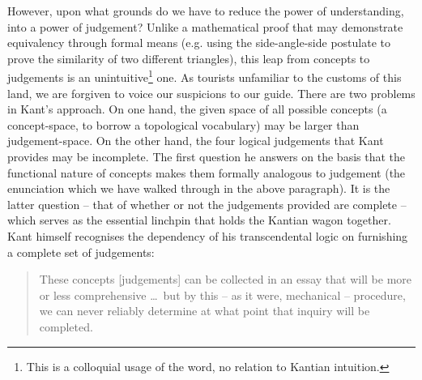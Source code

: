 However, upon what grounds do we have to reduce the power of understanding, into a power of judgement? Unlike a mathematical proof that may demonstrate equivalency through formal means (e.g. using the side-angle-side postulate to prove the similarity of two different triangles), this leap from concepts to judgements is an unintuitive\footnote{This is a colloquial usage of the word, no relation to Kantian intuition.} one. As tourists unfamiliar to the customs of this land, we are forgiven to voice our suspicions to our guide. There are two problems in Kant's approach. On one hand, the given space of all possible concepts (a concept-space, to borrow a topological vocabulary) may be larger than judgement-space. On the other hand, the four logical judgements that Kant provides may be incomplete. The first question he answers on the basis that the functional nature of concepts makes them formally analogous to judgement (the enunciation which we have walked through in the above paragraph). It is the latter question -- that of whether or not the judgements provided are complete -- which serves as the essential linchpin that holds the Kantian wagon together. Kant himself recognises the dependency of his transcendental logic on furnishing a complete set of judgements:

\begin{quote}
  These concepts [judgements] can be collected in an essay that will be more or less comprehensive \ldots\ but by this -- as it were, mechanical -- procedure, we can never reliably determine at what point that inquiry will be completed.

  \autocite[B92]{hackett}
\end{quote}

